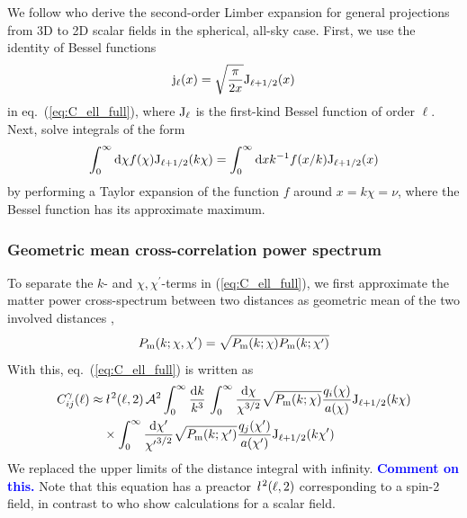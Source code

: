 \documentclass[fleqn,usenatbib]{mnras} %
\newcommand{\ellbar}{\hbox{\it \l}\,}
\newcommand{\pref}{{\cal A}}
\newcommand{\mk}[1]{{\bf\textcolor{blue}{#1}}}
\begin{document}
We follow \cite{2008PhRvD..78l3506L} who derive the second-order Limber
expansion for general projections from 3D to 2D scalar fields in the spherical,
all-sky case. First, we use the identity of Bessel functions
%
\begin{equation}
  {\rm j}_\ell(x) = \sqrt{\frac{\pi}{2x}} {\rm J}_{\ell + 1/2}(x)
\end{equation}
%
in eq.~(\ref{eq:C_ell_full}), where ${\rm J}_\ell$ is the first-kind Bessel
function of order $\ell$. Next, \cite{2008PhRvD..78l3506L} solve integrals of
the form
%
\begin{equation}
  \int_0^\infty {\rm d} \chi f(\chi) {\rm J}_{\ell + 1/2}(k \chi)
  = \int_0^\infty {\rm d} x k^{-1} f(x/k) {\rm J}_{\ell + 1/2}(x)
  \label{eq:int_dchi}
\end{equation}
%
by performing a Taylor expansion of the function $f$ around $x = k \chi = \nu$, where
the Bessel function has its approximate maximum.

\subsubsection{Geometric mean cross-correlation power spectrum}

To separate the $k$- and $\chi, \chi^\prime$-terms in (\ref{eq:C_ell_full}), we
first approximate the matter power cross-spectrum between two distances as
geometric mean of the two involved distances \cite{2005PhRvD..72b3516C,2016arXiv161200770K},
%
\begin{equation}
 P_{\rm m}(k; \chi, \chi^\prime) = \sqrt{ P_{\rm m}(k; \chi) P_{\rm m}(k; \chi^\prime) }
  \label{eq:P_geom_mean}
\end{equation}
%
With this, eq.~(\ref{eq:C_ell_full}) is written as
%
\begin{align}
  C^\gamma_{ij}(\ell) \approx & \, \ellbar^2(\ell, 2) \, \pref^2
                \int_0^\infty \frac{{\rm d} k}{k^3} \,
                \int_{0}^\infty \frac{{\rm d} \chi}{\chi^{3/2}} \sqrt{P_{\rm m}(k; \chi)}
                \frac{q_i(\chi)}{a(\chi)} {\rm J}_{\ell+1/2}(k \chi)
                \nonumber \\
                 & \times
                \int_{0}^\infty \frac{{\rm d} \chi^\prime}{{\chi^\prime}^{3/2}}
                \sqrt{P_{\rm m}(k; \chi^\prime)} \frac{q_j(\chi^\prime)}{a(\chi^\prime)} {\rm J}_{\ell+1/2}(k \chi^\prime)
  \label{eq:C_ell_full_Pk}
\end{align}
%
We replaced the upper limits of the distance integral with infinity. \mk{Comment on this.}
Note that this equation has a preactor $\ellbar^2(\ell, 2)$ corresponding to a spin-2 field, in contrast
to \cite{2008PhRvD..78l3506L} who show calculations for a scalar field.
\end{document}
